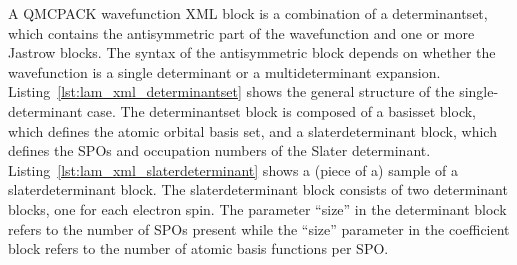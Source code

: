 A QMCPACK wavefunction XML block is a combination of a determinantset, which
contains the antisymmetric part of the wavefunction and one or more Jastrow blocks.
The syntax of the antisymmetric block depends on whether the wavefunction is a single
determinant or a multideterminant expansion. Listing~\ref{lst:lam_xml_determinantset} 
shows the general structure of the
single-determinant case. The determinantset block is composed of a basisset block, which
defines the atomic orbital basis set, and a slaterdeterminant block, which defines the SPOs and occupation numbers of the Slater determinant.
 Listing~\ref{lst:lam_xml_slaterdeterminant} shows a (piece of a) sample of a 
slaterdeterminant block. The
slaterdeterminant block consists of two determinant blocks, one for each electron spin. The
parameter ``size” in the determinant block refers to the number of SPOs
present while the ``size” parameter in the coefficient block refers to the number of atomic
basis functions per SPO.


